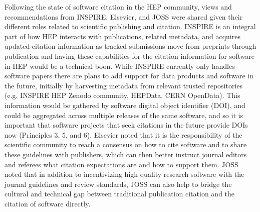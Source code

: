 Following the state of software citation in the HEP community, views and recommendations from INSPIRE, Elsevier, and JOSS were shared given their different roles related to scientific publishing and citation.
INSPIRE is an integral part of how HEP interacts with publications, related metadata, and acquires updated citation information as tracked submissions move from preprints through publication and having these capabilities for the citation information for software in HEP would be a technical boon.
While INSPIRE currently only handles software papers there are plans to add support for data products and software in the future, initially by harvesting metadata from relevant trusted repositories (e.g. INSPIRE HEP Zenodo community, HEPData, CERN OpenData).
This information would be gathered by software digital object identifier (DOI), and could be aggregated across multiple releases of the same software, and so it is important that software projects that seek citations in the future provide DOIs now (Principles 3, 5, and 6).
Elsevier noted that it is the responsibility of the scientific community to reach a consensus on how to cite software and to share these guidelines with publishers, which can then better instruct journal editors and referees what citation expectations are and how to support them.
JOSS noted that in addition to incentivizing high quality research software with the journal guidelines and review standards, JOSS can also help to bridge the cultural and technical gap between traditional publication citation and the citation of software directly.
